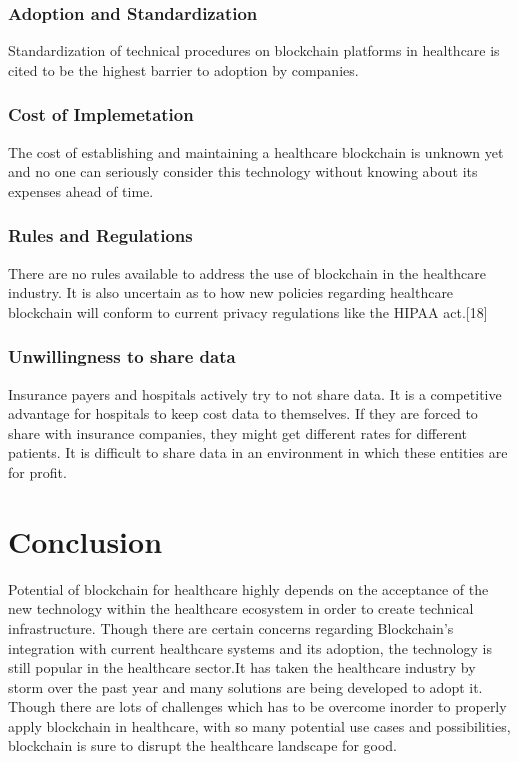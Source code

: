 \documentclass[12pt]{report}
\begin{document}
\subsection{Adoption and Standardization}
Standardization of technical procedures on blockchain platforms in healthcare is cited to be the highest barrier to adoption by companies.
\subsection{Cost of Implemetation}
The cost of establishing and maintaining a healthcare blockchain is unknown yet and no one can seriously consider this technology without knowing about its expenses ahead of time.
\subsection{Rules and Regulations}
There are no rules available to address the use of blockchain in the healthcare industry. It is also uncertain as to how new policies regarding healthcare blockchain will conform to current privacy regulations like the HIPAA act.[18]
\subsection{Unwillingness to share data}
Insurance payers and hospitals actively try to not share data. It is a competitive advantage for hospitals to keep cost data to themselves. If they are forced to share with insurance companies, they might get different rates for different patients. It is difficult to share data in an environment in which these entities are for profit.





\chapter{Conclusion}
Potential of blockchain for healthcare highly depends on the acceptance of the new technology within the healthcare ecosystem in order to create technical infrastructure. Though there are certain concerns regarding Blockchain’s integration with current healthcare systems and its adoption, the technology is still popular in the healthcare sector.It has taken the healthcare industry by storm over the past year and many solutions are being developed to adopt it. Though there are lots of challenges which has to be overcome inorder to properly apply blockchain in healthcare, with so many potential use cases and possibilities, blockchain is sure to disrupt the healthcare landscape for good.
\end{document}

